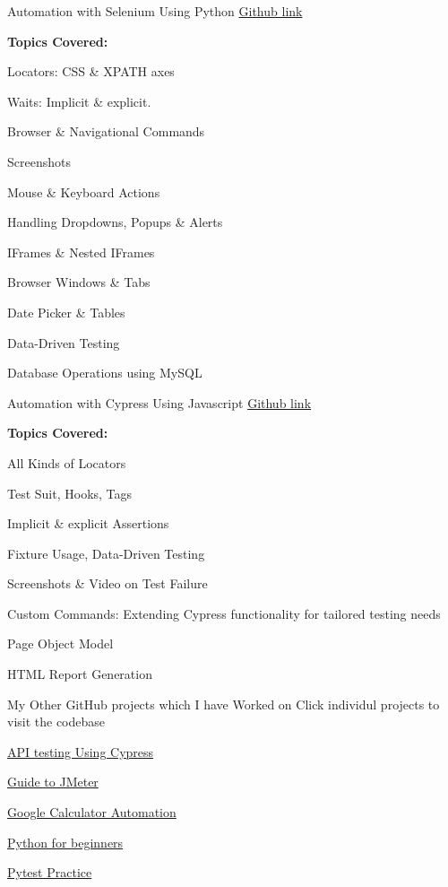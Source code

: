{}
{Automation with Selenium Using Python}
{\href{https://github.com/fazleyazdan/SeleniumPythonAutomation}{Github link}}
{\jbegin
    \item{\textbf{Topics Covered:} {}}
    \item {Locators: CSS \& XPATH axes}
    \item {Waits: Implicit \& explicit.}
    \item {Browser \& Navigational Commands}
    \item {Screenshots}
    \item {Mouse \& Keyboard Actions}
    \item {Handling Dropdowns, Popups \& Alerts}
    \item {IFrames \& Nested IFrames}
    \item {Browser Windows & Tabs}
    \item {Date Picker & Tables}
    \item {Data-Driven Testing}
    \item {Database Operations using MySQL}
\jend}

{}
{Automation with Cypress Using Javascript}
{\href{https://github.com/fazleyazdan/cypress-automation}{Github link}}
{\jbegin
    \item{\textbf{Topics Covered:} {}}
    \item {All Kinds of Locators}
    \item {Test Suit, Hooks, Tags}
    \item {Implicit \& explicit Assertions}
    \item {Fixture Usage, Data-Driven Testing}
    \item {Screenshots \& Video on Test Failure}
    \item {Custom Commands: Extending Cypress functionality for tailored testing needs}
    \item {Page Object Model}
    \item {HTML Report Generation}    
\jend}

{}
{My Other GitHub projects which I have Worked on}
{Click individul projects to visit the codebase}
{\jbegin
    \item {\href{https://github.com/fazleyazdan/cypress-api-testing}{API testing Using Cypress}}
    \item {\href{https://github.com/fazleyazdan/Jmeter-Guide}{Guide to JMeter}}
    \item {\href{https://github.com/fazleyazdan/Google-calculator-automation}{Google Calculator Automation}}
    \item {\href{https://github.com/fazleyazdan/beginners-python}{Python for beginners}}
    \item {\href{https://github.com/fazleyazdan/pytest-practice}{Pytest Practice}}
\jend}










